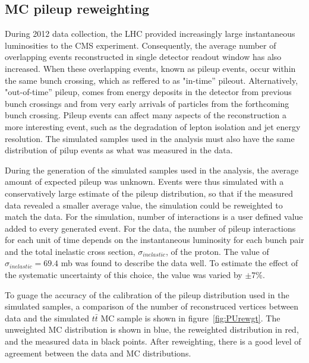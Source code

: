 \subsection{MC pileup reweighting}
\label{mc_pileup_reweight_overview}

\par During 2012 data collection, the LHC provided increasingly
large instantaneous luminosities to the CMS experiment.  Consequently,
the average number of overlapping events reconstructed in single
detector readout window has also increased.  When these overlapping
events, known as pileup events, occur within the same bunch crossing,
which as reffered to as "in-time'' pileout.  Alternatively,
"out-of-time'' pileup, comes from energy deposits in the detector from
previous bunch crossings and from very early arrivals of particles
from the forthcoming bunch crossing.  Pileup events can affect many
aspects of the reconstruction a more interesting event, such as the
degradation of lepton isolation and jet energy resolution.  The
simulated samples used in the analysis must also have the same
distribution of pilup events as what was measured in the data.

\par During the generation of the simulated samples used in the
analysis, the average amount of expected pileup was unknown.  Events
were thus simulated with a conservatively large estimate of the pileup
distribution, so that if the measured data revealed a smaller average
value, the simulation could be reweighted to match the data.  
For the simulation, number of interactions is a user defined value
added to every generated event.  For the data, the number of pileup
interactions for each unit of time depends on the instantaneous luminosity for each bunch pair and the
total inelastic cross section, $\sigma_{inelastic}$, of the proton.
The value of $\sigma_{inelastic} = 69.4$ mb was found to describe the data
well.  To estimate the effect of the systematic uncertainty of this
choice, the value was varied by $\pm 7\%$.  

\par To guage the accuracy of the calibration of the pileup
distribution used in the simulated samples, a comparison of the
number of reconstruced vertices between data and the simulated
$t\bar{t}$ MC sample is shown in figure~\ref{fig:PUrewgt}.  The
unweighted MC distribution is shown in blue, the reweighted
distribution in red, and the measured data in black points.  After
reweighting, there is a good level of agreement between the data and
MC distributions.  

